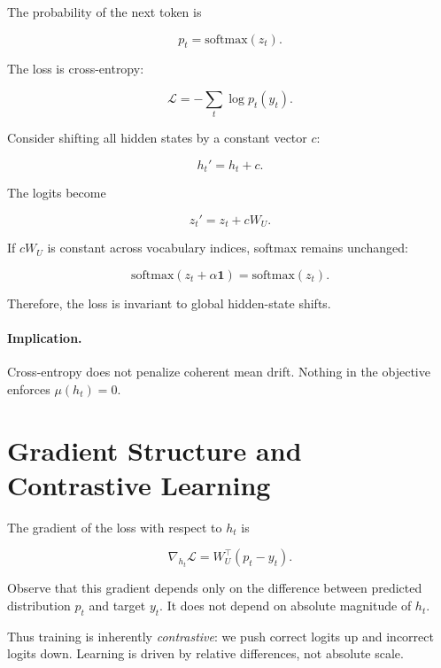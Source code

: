 The probability of the next token is

\begin{equation}
p_t = \mathrm{softmax}(z_t).
\end{equation}

The loss is cross-entropy:

\begin{equation}
\mathcal{L}
=
-\sum_{t} \log p_t(y_t).
\end{equation}

Consider shifting all hidden states by a constant vector $c$:

\begin{equation}
h_t' = h_t + c.
\end{equation}

The logits become

\begin{equation}
z_t' = z_t + c W_U.
\end{equation}

If $cW_U$ is constant across vocabulary indices,
softmax remains unchanged:

\begin{equation}
\mathrm{softmax}(z_t + \alpha \mathbf{1}) = \mathrm{softmax}(z_t).
\end{equation}

Therefore, the loss is invariant to global hidden-state shifts.

\paragraph{Implication.}
Cross-entropy does not penalize coherent mean drift.
Nothing in the objective enforces $\mu(h_t) = 0$.

\section{Gradient Structure and Contrastive Learning}

The gradient of the loss with respect to $h_t$ is

\begin{equation}
\nabla_{h_t} \mathcal{L}
=
W_U^\top (p_t - y_t).
\end{equation}

Observe that this gradient depends only on the difference
between predicted distribution $p_t$ and target $y_t$.
It does not depend on absolute magnitude of $h_t$.

Thus training is inherently \emph{contrastive}:
we push correct logits up and incorrect logits down.
Learning is driven by relative differences,
not absolute scale.

